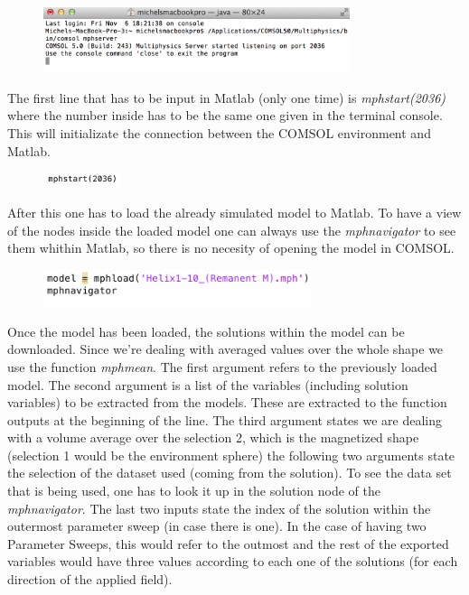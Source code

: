 \begin{figure}[H]
	\centering
  \includegraphics[width=0.8\textwidth]{Pictures/Screenshots/Sim31.png}
\end{figure} 

The first line that has to be input in Matlab (only one time) is \textit{mphstart(2036)} where the number inside has to be the same one given in the terminal console. This will initializate the connection between the COMSOL environment and Matlab.

\begin{figure}[H]
	\centering
  \includegraphics[width=0.2\textwidth]{Pictures/Screenshots/Sim32.png}
\end{figure} 

After this one has to load the already simulated model to Matlab. To have a view of the nodes inside the loaded model one can always use the \textit{mphnavigator} to see them whithin Matlab, so there is no necesity of opening the model in COMSOL.

\begin{figure}[H]
	\centering
  \includegraphics[width=0.7\textwidth]{Pictures/Screenshots/Sim33.png}
\end{figure} 

Once the model has been loaded, the solutions within the model can be downloaded. Since we're dealing with averaged values over the whole shape we use the function \textit{mphmean}. The first argument refers to the previously loaded model. The second argument is a list of the variables (including solution variables) to be extracted from the models. These are extracted to the function outputs at the beginning of the line. The third argument states we are dealing with a volume average over the selection 2, which is the magnetized shape (selection 1 would be the environment sphere) the following two arguments state the selection of the dataset used (coming from the solution). To see the data set that is being used, one has to look it up in the solution node of the \textit{mphnavigator}. The last two inputs state the index of the solution within the outermost parameter sweep (in case there is one). In the case of having two Parameter Sweeps, this would refer to the outmost and the rest of the exported variables would have three values according to each one of the solutions (for each direction of the applied field).\\

